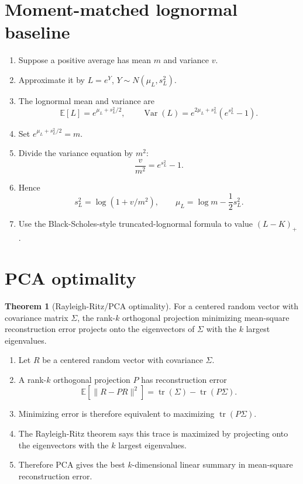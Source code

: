 \documentclass[11pt,oneside]{book}
\theoremstyle{definition}
\newtheorem{theorem}{Theorem}[chapter]
\newenvironment{proofsteps}
{\begin{enumerate}[label=\textbf{Line \arabic*.}, itemsep=0.35em]}
{\end{enumerate}}
\newcommand{\E}{\mathbb{E}}
\newcommand{\Var}{\operatorname{Var}}
\begin{document}
\section{Moment-matched lognormal baseline}
\begin{proofsteps}
\item Suppose a positive average has mean \(m\) and variance \(v\).
\item Approximate it by \(L=e^Y\), \(Y\sim N(\mu_L,s_L^2)\).
\item The lognormal mean and variance are
\[
\E[L]=e^{\mu_L+s_L^2/2},\qquad
\Var(L)=e^{2\mu_L+s_L^2}(e^{s_L^2}-1).
\]
\item Set \(e^{\mu_L+s_L^2/2}=m\).
\item Divide the variance equation by \(m^2\):
\[
\frac{v}{m^2}=e^{s_L^2}-1.
\]
\item Hence
\[
s_L^2=\log(1+v/m^2),\qquad
\mu_L=\log m-\frac12s_L^2.
\]
\item Use the Black-Scholes-style truncated-lognormal formula to value \((L-K)_+\).
\end{proofsteps}

\section{PCA optimality}
\begin{theorem}[Rayleigh-Ritz/PCA optimality]
For a centered random vector with covariance matrix \(\Sigma\), the rank-\(k\) orthogonal projection minimizing mean-square reconstruction error projects onto the eigenvectors of \(\Sigma\) with the \(k\) largest eigenvalues.
\end{theorem}
\begin{proofsteps}
\item Let \(R\) be a centered random vector with covariance \(\Sigma\).
\item A rank-\(k\) orthogonal projection \(P\) has reconstruction error
\[
\E[\|R-PR\|^2]=\operatorname{tr}(\Sigma)-\operatorname{tr}(P\Sigma).
\]
\item Minimizing error is therefore equivalent to maximizing \(\operatorname{tr}(P\Sigma)\).
\item The Rayleigh-Ritz theorem says this trace is maximized by projecting onto the eigenvectors with the \(k\) largest eigenvalues.
\item Therefore PCA gives the best \(k\)-dimensional linear summary in mean-square reconstruction error.
\end{proofsteps}
\end{document}
